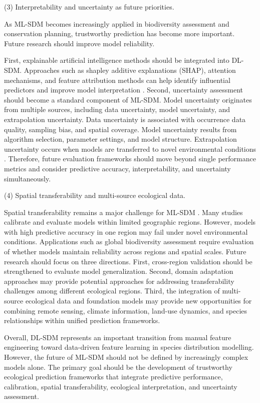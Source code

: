 \documentclass[authoryear,preprint,review,12pt]{elsarticle}
\begin{document}
(3) Interpretability and uncertainty as future priorities.

As ML-SDM becomes increasingly applied in biodiversity assessment and conservation planning, trustworthy prediction has become more important. Future research should improve model reliability.

First, explainable artificial intelligence methods should be integrated into DL-SDM. Approaches such as shapley additive explanations (SHAP), attention mechanisms, and feature attribution methods can help identify influential predictors and improve model interpretation \citep{huang2025identification, du2025revealing}. Second, uncertainty assessment should become a standard component of ML-SDM. Model uncertainty originates from multiple sources, including data uncertainty, model uncertainty, and extrapolation uncertainty. Data uncertainty is associated with occurrence data quality, sampling bias, and spatial coverage. Model uncertainty results from algorithm selection, parameter settings, and model structure. Extrapolation uncertainty occurs when models are transferred to novel environmental conditions \citep{meyer2016multidimensional, vrugt2003shuffled, yanlong2020challenges}. Therefore, future evaluation frameworks should move beyond single performance metrics and consider predictive accuracy, interpretability, and uncertainty simultaneously.

(4) Spatial transferability and multi-source ecological data.

Spatial transferability remains a major challenge for ML-SDM \citep{yanlong2020challenges}. Many studies calibrate and evaluate models within limited geographic regions. However, models with high predictive accuracy in one region may fail under novel environmental conditions. Applications such as global biodiversity assessment require evaluation of whether models maintain reliability across regions and spatial scales. Future research should focus on three directions. First, cross-region validation should be strengthened to evaluate model generalization. Second, domain adaptation approaches may provide potential approaches for addressing transferability challenges among different ecological regions. Third, the integration of multi-source ecological data and foundation models may provide new opportunities for combining remote sensing, climate information, land-use dynamics, and species relationships within unified prediction frameworks.

Overall, DL-SDM represents an important transition from manual feature engineering toward data-driven feature learning in species distribution modelling. However, the future of ML-SDM should not be defined by increasingly complex models alone. The primary goal should be the development of trustworthy ecological prediction frameworks that integrate predictive performance, calibration, spatial transferability, ecological interpretation, and uncertainty assessment.
\end{document}
